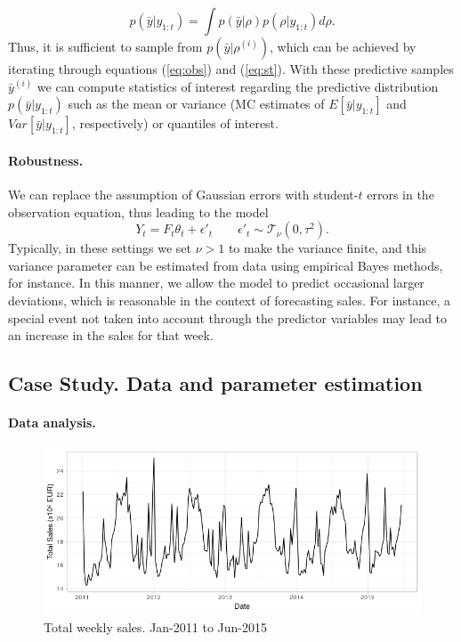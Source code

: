 \[
p(\bar{y} | y_{1:t}) = \int p(\bar{y}| \rho)p(\rho | y_{1:t}) d\rho.
\]
Thus, it is sufficient to sample from $p(\bar{y}| \rho^{(i)})$, which can be achieved by iterating through equations (\ref{eq:obs}) and (\ref{eq:st}). With these predictive samples $\bar{y}^{(i)}$ we can compute statistics of interest regarding the predictive distribution   $p(\bar{y} | y_{1:t})$ such as the mean or variance (MC estimates of $E[ \bar{y} | y_{1:t}]$ and $Var[\bar{y} | y_{1:t}]$, respectively) or quantiles of interest.\\


\paragraph{Robustness.}

We can replace the assumption of Gaussian errors with student-$t$ errors in the observation equation, thus leading to the model
$$ 
Y_{t} = F_t \theta_t + \epsilon'_t \qquad \epsilon'_t \sim \mathcal{T}_\nu(0, \tau^2).
$$
Typically, in these settings we set $\nu > 1$ to make the variance finite, and this variance parameter can be estimated from data using empirical Bayes methods, for instance.
In this manner, we allow the model to predict occasional larger deviations, which is reasonable in the context of forecasting sales. For instance, a special event not taken into account through the predictor variables may lead to an increase in the sales for that week.


\subsection{Case Study. Data and parameter estimation}

\paragraph{Data analysis.}


\begin{figure}[h]
\centering
\includegraphics[scale=0.6]{figures/01_Sales.png}
\caption{Total weekly sales. Jan-2011 to Jun-2015}\label{fig:sales}
\end{figure}



